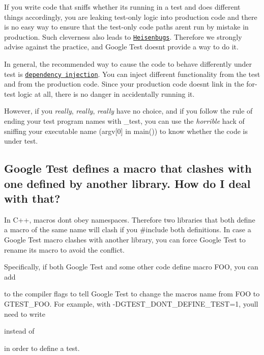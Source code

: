 If you write code that sniffs whether it\textquotesingle{}s running in a test and does different things accordingly, you are leaking test-\/only logic into production code and there is no easy way to ensure that the test-\/only code paths aren\textquotesingle{}t run by mistake in production. Such cleverness also leads to \href{http://en.wikipedia.org/wiki/Unusual_software_bug#Heisenbug}{\tt Heisenbugs}. Therefore we strongly advise against the practice, and Google Test doesn\textquotesingle{}t provide a way to do it.

In general, the recommended way to cause the code to behave differently under test is \href{http://jamesshore.com/Blog/Dependency-Injection-Demystified.html}{\tt dependency injection}. You can inject different functionality from the test and from the production code. Since your production code doesn\textquotesingle{}t link in the for-\/test logic at all, there is no danger in accidentally running it.

However, if you {\itshape really}, {\itshape really}, {\itshape really} have no choice, and if you follow the rule of ending your test program names with {\ttfamily \+\_\+test}, you can use the {\itshape horrible} hack of sniffing your executable name ({\ttfamily argv\mbox{[}0\mbox{]}} in {\ttfamily main()}) to know whether the code is under test.

\subsection*{Google Test defines a macro that clashes with one defined by another library. How do I deal with that?}

In C++, macros don\textquotesingle{}t obey namespaces. Therefore two libraries that both define a macro of the same name will clash if you {\ttfamily \#include} both definitions. In case a Google Test macro clashes with another library, you can force Google Test to rename its macro to avoid the conflict.

Specifically, if both Google Test and some other code define macro {\ttfamily F\+OO}, you can add 
\begin{DoxyCode}{0}
\end{DoxyCode}
 to the compiler flags to tell Google Test to change the macro\textquotesingle{}s name from {\ttfamily F\+OO} to {\ttfamily G\+T\+E\+S\+T\+\_\+\+F\+OO}. For example, with {\ttfamily -\/D\+G\+T\+E\+S\+T\+\_\+\+D\+O\+N\+T\+\_\+\+D\+E\+F\+I\+N\+E\+\_\+\+T\+E\+ST=1}, you\textquotesingle{}ll need to write 
\begin{DoxyCode}{0}
\end{DoxyCode}
 instead of 
\begin{DoxyCode}{0}
\end{DoxyCode}
 in order to define a test.

